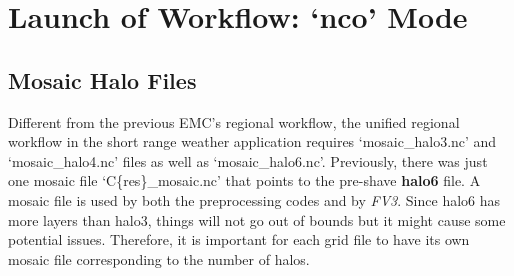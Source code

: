 \documentclass[11pt,fleqn]{report}              %
\begin{document}
\section{Launch of Workflow: `nco' Mode}
\label{sec:workflow_launch_nco}

\subsection{Mosaic Halo Files}
\label{subsec:mosaic_halo}

Different from the previous EMC's regional workflow, the unified regional workflow in the short range weather application requires `mosaic\_halo3.nc' and `mosaic\_halo4.nc' files as well as `mosaic\_halo6.nc'. Previously, there was just one mosaic file `C\{res\}\_mosaic.nc' that points to the pre-shave {\bf halo6} file. A mosaic file is used by both the preprocessing codes and by {\it FV3}. Since halo6 has more layers than halo3, things will not go out of bounds but it might cause some potential issues. Therefore, it is important for each grid file to have its own mosaic file corresponding to the number of halos.
\end{document}

